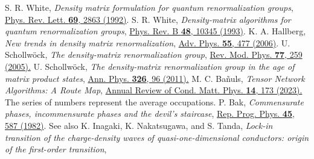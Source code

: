 \documentclass[aps,prl,showpacs,twocolumn,superscriptaddress]{revtex4-2}
\begin{document}
\begin{thebibliography}{99}
S. R. White,
{\it Density matrix formulation for quantum renormalization groups},
\href{https://journals.aps.org/prl/abstract/10.1103/PhysRevLett.69.2863}{Phys. Rev. Lett. {\bf 69}, 2863 (1992)}.
S. R. White,
{\it Density-matrix algorithms for quantum renormalization groups},
\href{https://journals.aps.org/prb/abstract/10.1103/PhysRevB.48.10345}{Phys. Rev. B {\bf 48}, 10345 (1993)}.
 K. A. Hallberg,
 {\it New trends in density matrix renormalization},
 \href{https://www.tandfonline.com/doi/full/10.1080/00018730600766432}{ Adv. Phys. {\bf 55}, 477 (2006)}.
 U. Schollw\"ock,
{\it The density-matrix renormalization group}, \href{https://journals.aps.org/rmp/abstract/10.1103/RevModPhys.77.259}{Rev. Mod. Phys. {\bf 77}, 259 (2005).}
 U. Schollw\"ock,
{\it The density-matrix renormalization group in the age of matrix product states}, \href{https://www.sciencedirect.com/science/article/pii/S0003491610001752}{Ann. Phys. {\bf 326}, 96 (2011).}
 M. C. Ba\~nuls,
{\it Tensor Network Algorithms: A Route Map}, \href{https://www.annualreviews.org/doi/full/10.1146/annurev-conmatphys-040721-022705}{Annual Review of Cond. Matt. Phys. {\bf 14}, 173 (2023).}
The series of numbers represent the average occupations.
P. Bak,
{\it Commensurate phases, incommensurate phases and the
devil's staircase},
\href{https://iopscience.iop.org/article/10.1088/0034-4885/45/6/001/meta}{Rep. Prog. Phys. {\bf 45}, 587 (1982)}.
See also K. Inagaki, K. Nakatsugawa, and S. Tanda,
{\it Lock-in transition of the charge-density waves of
quasi-one-dimensional conductors: origin of the first-order
transition},

\end{thebibliography}
\end{document}
